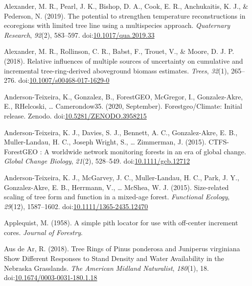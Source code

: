 \documentclass[
]{article}
\newlength{\cslhangindent}
\newenvironment{cslreferences}%
  {\setlength{\parindent}{0pt}%
  \everypar{\setlength{\hangindent}{\cslhangindent}}\ignorespaces}%
  {\par}
\begin{document}
\hypertarget{refs}{}
\begin{cslreferences}
\leavevmode\hypertarget{ref-alexander_potential_2019}{}%
Alexander, M. R., Pearl, J. K., Bishop, D. A., Cook, E. R., Anchukaitis,
K. J., \& Pederson, N. (2019). The potential to strengthen temperature
reconstructions in ecoregions with limited tree line using a
multispecies approach. \emph{Quaternary Research}, \emph{92}(2),
583--597.
doi:\href{https://doi.org/10.1017/qua.2019.33}{10.1017/qua.2019.33}

\leavevmode\hypertarget{ref-alexander_relative_2018}{}%
Alexander, M. R., Rollinson, C. R., Babst, F., Trouet, V., \& Moore, D.
J. P. (2018). Relative influences of multiple sources of uncertainty on
cumulative and incremental tree-ring-derived aboveground biomass
estimates. \emph{Trees}, \emph{32}(1), 265--276.
doi:\href{https://doi.org/10.1007/s00468-017-1629-0}{10.1007/s00468-017-1629-0}

\leavevmode\hypertarget{ref-anderson-teixeira_forestgeoclimate_2020}{}%
Anderson-Teixeira, K., Gonzalez, B., ForestGEO, McGregor, I.,
Gonzalez-Akre, E., RHelcoski, \ldots{} Camerondow35. (2020, September).
Forestgeo/Climate: Initial release. Zenodo.
doi:\href{https://doi.org/10.5281/ZENODO.3958215}{10.5281/ZENODO.3958215}

\leavevmode\hypertarget{ref-anderson-teixeira_ctfs-forestgeo_2015}{}%
Anderson-Teixeira, K. J., Davies, S. J., Bennett, A. C., Gonzalez-Akre,
E. B., Muller-Landau, H. C., Joseph Wright, S., \ldots{} Zimmerman, J.
(2015). CTFS-ForestGEO : A worldwide network monitoring forests in an
era of global change. \emph{Global Change Biology}, \emph{21}(2),
528--549.
doi:\href{https://doi.org/10.1111/gcb.12712}{10.1111/gcb.12712}

\leavevmode\hypertarget{ref-anderson-teixeira_size-related_2015}{}%
Anderson-Teixeira, K. J., McGarvey, J. C., Muller-Landau, H. C., Park,
J. Y., Gonzalez-Akre, E. B., Herrmann, V., \ldots{} McShea, W. J.
(2015). Size-related scaling of tree form and function in a mixed-age
forest. \emph{Functional Ecology}, \emph{29}(12), 1587--1602.
doi:\href{https://doi.org/10.1111/1365-2435.12470}{10.1111/1365-2435.12470}

\leavevmode\hypertarget{ref-applequist_simple_1958}{}%
Applequist, M. (1958). A simple pith locator for use with off-center
increment cores. \emph{Journal of Forestry}.

\leavevmode\hypertarget{ref-aus_de_ar_tree_2018}{}%
Aus de Ar, R. (2018). Tree Rings of Pinus ponderosa and Juniperus
virginiana Show Different Responses to Stand Density and Water
Availability in the Nebraska Grasslands. \emph{The American Midland
Naturalist}, \emph{180}(1), 18.
doi:\href{https://doi.org/10.1674/0003-0031-180.1.18}{10.1674/0003-0031-180.1.18}


\end{cslreferences}
\end{document}
